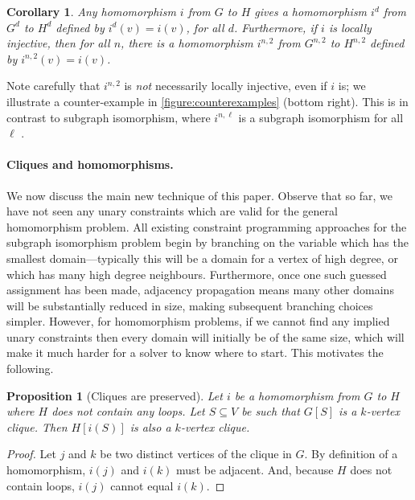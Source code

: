 \documentclass{article}
\newtheorem{proposition}{Proposition}
\newtheorem{corollary}{Corollary}
\begin{document}
\begin{corollary}Any homomorphism $i$ from $G$ to $H$ gives a homomorphism $i^d$ from $G^d$ to $H^d$
    defined by $i^d(v) = i(v)$, for all $d$. Furthermore, if $i$ is locally injective, then for all
    $n$, there is a homomorphism $i^{n,2}$ from $G^{n,2}$ to
    $H^{n,2}$ defined by $i^{n,2}(v) = i(v)$.\label{corollary:lishapes}
\end{corollary}

Note carefully that $i^{n,2}$ is \emph{not} necessarily locally injective, even if $i$ is; we
illustrate a counter-example in \cref{figure:counterexamples} (bottom right). This is in contrast to
subgraph isomorphism, where $i^{n,\ell}$ is a subgraph isomorphism for all $\ell$
\cite{DBLP:conf/cp/McCreeshP15}.

\paragraph{Cliques and homomorphisms.} We now discuss the main new technique of this paper. Observe
that so far, we have not seen any unary constraints which are valid for the general homomorphism
problem. All existing constraint programming approaches for the subgraph isomorphism problem begin
by branching on the variable which has the smallest domain---typically this will be a domain for a
vertex of high degree, or which has many high degree neighbours. Furthermore, once one such
guessed assignment has been made, adjacency propagation means many other domains will be
substantially reduced in size, making subsequent branching choices simpler.  However, for
homomorphism problems, if we cannot find any implied unary constraints then every domain will
initially be of the same size, which will make it much harder for a solver to know where to start.
This motivates the following.

\begin{proposition}[Cliques are preserved]\label{proposition:clique}
    Let $i$ be a homomorphism from $G$ to $H$ where $H$ does
    not contain any loops. Let $S\subseteq V$ be such that $G[S]$ is a $k$-vertex clique. Then
    $H[i(S)]$ is also a $k$-vertex clique.
\end{proposition}

\begin{proof}
    Let $j$ and $k$ be two distinct vertices of the clique in $G$. By definition of a homomorphism,
    $i(j)$ and $i(k)$ must be adjacent. And, because $H$ does not contain loops, $i(j)$ cannot equal
    $i(k)$.
\end{proof}
\end{document}
